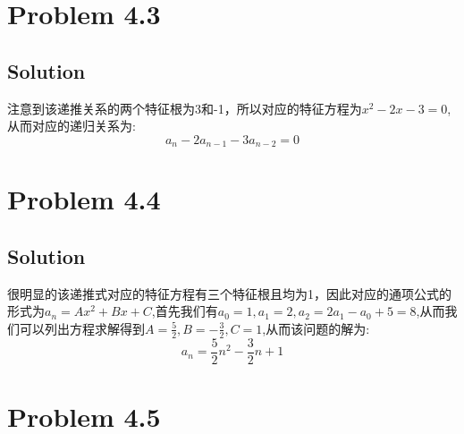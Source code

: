 \documentclass[a4paper]{ctexart}
\begin{document}
\section{Problem 4.3}
\subsection{Solution}
注意到该递推关系的两个特征根为3和-1，所以对应的特征方程为$x^2-2x-3=0$,从而对应的递归关系为:
\begin{equation}
    a_n - 2a_{n-1} -3a_{n-2} = 0
\end{equation}

\section{Problem 4.4}
\subsection{Solution}
很明显的该递推式对应的特征方程有三个特征根且均为1，因此对应的通项公式的形式为$a_n = Ax^2 + Bx + C$,首先我们有$a_0=1, a_1=2, a_2 = 2a_1 - a_0 +5 =8$,从而我们可以列出方程求解得到$A= \frac{5}{2},B=-\frac{3}{2}, C=1$,从而该问题的解为:
\begin{equation}
    a_n = \frac{5}{2}n^2 -\frac{3}{2}n+1
\end{equation}


\section{Problem 4.5}
\end{document}
